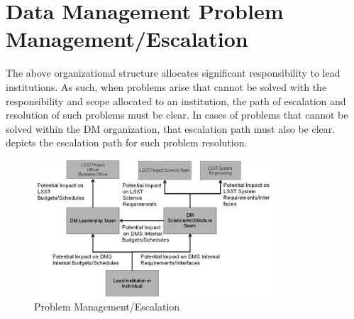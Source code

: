 \section{Data Management Problem Management/Escalation}
The above organizational structure allocates significant responsibility to lead institutions.  As such, when problems arise that cannot be solved with the responsibility and scope allocated to an institution, the path of escalation and resolution of such problems must be clear.  In cases of problems that cannot be solved within the DM organization, that escalation path must also be clear.    depicts the escalation path for such problem resolution.


\begin{figure}[htbp]
\begin{center}
 \includegraphics[width=0.8\textwidth]{images/probman}
\caption{Problem Management/Escalation\label{fig:probman}}
\end{center}
\end{figure}


